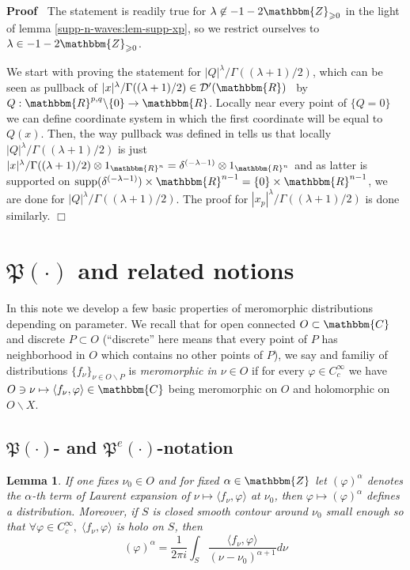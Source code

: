 \documentclass{article}
\newcommand{\nin}{\not\in}
\newcommand{\tmop}[1]{\ensuremath{\operatorname{#1}}}
\newcommand{\tmtextit}[1]{{\itshape{#1}}}
\newenvironment{proof}{\noindent\textbf{Proof\ }}{\hspace*{\fill}$\Box$\medskip}
\numberwithin{definition}{section}
\newtheorem{lemma}{Lemma}
\numberwithin{lemma}{section}
\numberwithin{proposition}{section}
{\theorembodyfont{\rmfamily}\newtheorem{remark}{Remark}
\numberwithin{remark}{section}
}
\begin{document}
\begin{proof}
  The statement is readily true for $\lambda \nin - 1 -
  2\mathbbm{Z}_{\geqslant 0}$ in the light of lemma
  \ref{supp-n-waves:lem-supp-xp}, so we restrict ourselves to $\lambda \in - 1
  - 2\mathbbm{Z}_{\geqslant 0}$.
  
  We start with proving the statement for $| Q |^{\lambda} / \Gamma ( (
  \lambda + 1) / 2)$, which can be seen as pullback of $| x |^{\lambda} /
  \Gamma ( ( \lambda + 1) / 2) \in \mathcal{D}' ( \mathbbm{R})$ \ by $Q :
  \mathbbm{R}^{p, q} \backslash \{ 0 \} \rightarrow \mathbbm{R}$. Locally near
  every point of $\{ Q = 0 \}$ we can define coordinate system in which the
  first coordinate will be equal to $Q ( x)$. Then, the way pullback was
  defined in {\cite{hormander1983analysis}} tells us that locally $| Q
  |^{\lambda} / \Gamma ( ( \lambda + 1) / 2)$ is just $| x |^{\lambda} /
  \Gamma ( ( \lambda + 1) / 2) \otimes 1_{\mathbbm{R}^n} = \delta^{( - \lambda
  - 1)} \otimes 1_{\mathbbm{R}^n}$ and as latter is supported on $\tmop{supp}
  ( \delta^{( - \lambda - 1)}) \times \mathbbm{R}^{n - 1} = \{ 0 \} \times
  \mathbbm{R}^{n - 1}$, we are done for $| Q |^{\lambda} / \Gamma ( ( \lambda
  + 1) / 2)$. The proof for $| x_p |^{\lambda} / \Gamma ( ( \lambda + 1) / 2)$
  is done similarly.
\end{proof}

\section{$\mathfrak{P} ( \cdot)$ and related notions}

In this note we develop a few basic properties of meromorphic distributions
depending on parameter. We recall that for open connected $O \subset
\mathbbm{C}^{}$ and discrete $P \subset O$ (``discrete'' here means that every
point of $P$ has neighborhood in $O$ which contains no other points of $P$),
we say and familiy of distributions $\{ f_{\nu} \}_{\nu \in O\backslash P}$ is
\tmtextit{meromorphic in $\nu \in O$} if for every $\varphi \in C_c^{\infty}$
we have $O \ni \nu \mapsto \langle f_{\nu}, \varphi \rangle \in \mathbbm{C}$
being meromorphic on $O$ and holomorphic on $O\backslash X$.

\subsection{$\mathfrak{P} ( \cdot)$- and $\mathfrak{P}^e ( \cdot)$-notation}

\begin{lemma}
  \label{P-def:lem-laurent-distr}If one fixes $\nu_0 \in O$ and for fixed
  $\alpha \in \mathbbm{Z}^{}$ let $( \varphi)^{\alpha}$ denotes the
  $\alpha$-th term of Laurent expansion of $\nu \mapsto \langle f_{\nu},
  \varphi \rangle$ at $\nu_0$, then $\varphi \mapsto ( \varphi)^{\alpha}$
  defines a distribution. Moreover, if $S$ is closed smooth contour around
  $\nu_0$ small enough so that $\forall \varphi \in C^{\infty}_c, \; \langle
  f_{\nu}, \varphi \rangle$ is holo on $S$, then
  \[ ( \varphi)^{\alpha} = \frac{1}{2 \pi i} \int_S \frac{\langle f_{\nu},
     \varphi \rangle}{( \nu - \nu_0)^{\alpha + 1}} d \nu \]
\end{lemma}
\end{document}
